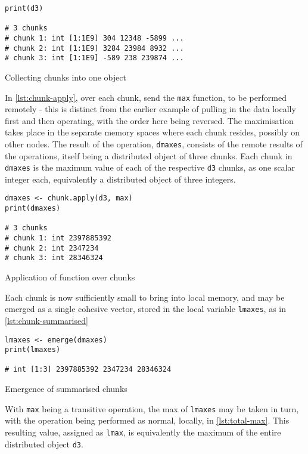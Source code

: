 \begin{listing}
    \begin{verbatim}
print(d3)

# 3 chunks
# chunk 1: int [1:1E9] 304 12348 -5899 ...
# chunk 2: int [1:1E9] 3284 23984 8932 ...
# chunk 3: int [1:1E9] -589 238 239874 ...
    \end{verbatim}
    \caption{Collecting chunks into one object}
    \label{lst:chunk-collection}
\end{listing}

In \ref{lst:chunk-apply}, over each chunk, send the \texttt{max} function, to be performed
remotely - this is distinct from the earlier example of pulling in the
data locally first and then operating, with the order here being
reversed. The maximisation takes place in the separate memory spaces
where each chunk resides, possibly on other nodes. The result of the
operation, \texttt{dmaxes}, consists of the remote results of the
operations, itself being a distributed object of three chunks. Each
chunk in \texttt{dmaxes} is the maximum value of each of the respective
\texttt{d3} chunks, as one scalar integer each, equivalently a
distributed object of three integers.

\begin{listing}
    \begin{verbatim}
dmaxes <- chunk.apply(d3, max)
print(dmaxes)

# 3 chunks
# chunk 1: int 2397885392
# chunk 2: int 2347234
# chunk 3: int 28346324
    \end{verbatim}
    \caption{Application of function over chunks}
    \label{lst:chunk-apply}
\end{listing}

Each chunk is now sufficiently small to bring into local memory, and may
be emerged as a single cohesive vector, stored in the local variable
\texttt{lmaxes}, as in \ref{lst:chunk-summarised}

\begin{listing}
    \begin{verbatim}
lmaxes <- emerge(dmaxes)
print(lmaxes)

# int [1:3] 2397885392 2347234 28346324
    \end{verbatim}
    \caption{Emergence of summarised chunks}
    \label{lst:chunk-summarised}
\end{listing}

With \texttt{max} being a transitive operation, the max of
\texttt{lmaxes} may be taken in turn, with the operation being performed
as normal, locally, in \ref{lst:total-max}. This resulting value, assigned as \texttt{lmax}, is
equivalently the maximum of the entire distributed object \texttt{d3}.

